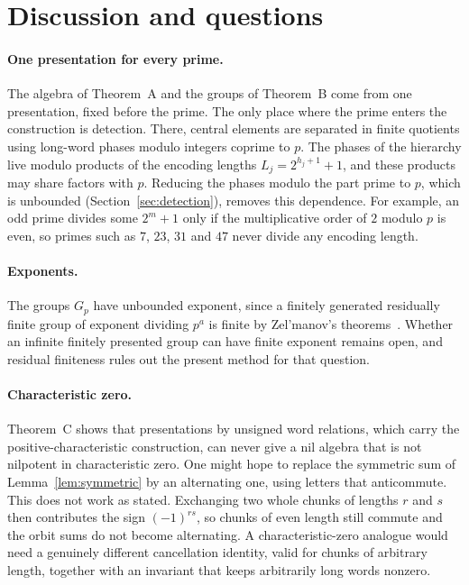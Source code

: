 \section{Discussion and questions}\label{sec:discussion}

\paragraph{One presentation for every prime.} The algebra of Theorem~A and the groups of Theorem~B come from one
presentation, fixed before the prime. The only place where the prime enters the construction is detection. There,
central elements are separated in finite quotients using long-word phases modulo integers coprime to $p$. The phases
of the hierarchy live modulo products of the encoding lengths $L_j=2^{h_j+1}+1$, and these products may share factors
with $p$. Reducing the phases modulo the part prime to $p$, which is unbounded (Section~\ref{sec:detection}), removes
this dependence. For example, an odd prime divides some $2^m+1$ only if the multiplicative order of $2$ modulo $p$ is
even, so primes such as $7$, $23$, $31$ and $47$ never divide any encoding length.

\paragraph{Exponents.} The groups $G_p$ have unbounded exponent, since a finitely generated residually finite group of
exponent dividing $p^a$ is finite by Zel'manov's theorems~\cite{ZelmanovOdd,ZelmanovTwo}. Whether an infinite
finitely presented group can have finite exponent remains open, and residual finiteness rules out the present method
for that question.

\paragraph{Characteristic zero.} Theorem~C shows that presentations by unsigned word relations, which carry the
positive-characteristic construction, can never give a nil algebra that is not nilpotent in characteristic zero. One
might hope to replace the symmetric sum of Lemma~\ref{lem:symmetric} by an alternating one, using letters that
anticommute. This does not work as stated. Exchanging two whole chunks of lengths $r$ and $s$ then contributes the sign
$(-1)^{rs}$, so chunks of even length still commute and the orbit sums do not become alternating. A characteristic-zero
analogue would need a genuinely different cancellation identity, valid for chunks of arbitrary length, together with an
invariant that keeps arbitrarily long words nonzero.

